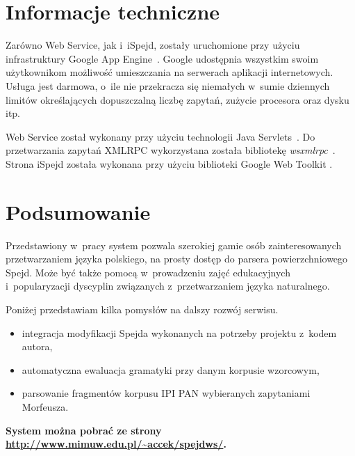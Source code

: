 \documentclass[11pt]{article}
\begin{document}
\section{Informacje techniczne}

Zarówno Web Service, jak i~iSpejd, zostały uruchomione przy użyciu
infrastruktury Google App Engine~\cite{appengine}. Google udostępnia wszystkim
swoim użytkownikom możliwość umieszczania na serwerach aplikacji internetowych.
Usługa jest darmowa, o~ile nie przekracza się niemałych w~sumie dziennych limitów
określających dopuszczalną liczbę zapytań, zużycie procesora oraz dysku itp.

Web Service został wykonany przy użyciu technologii Java
Servlets~\cite{servlets}. Do przetwarzania zapytań XML\dywiz RPC wykorzystana
została bibliotekę \emph{ws\dywiz xmlrpc}~\cite{wsxmlrpc}.
Strona iSpejd została wykonana przy użyciu biblioteki Google Web Toolkit
\cite{gwt}.

\section{Podsumowanie}

Przedstawiony w~pracy system pozwala szerokiej gamie osób zainteresowanych
przetwarzaniem języka polskiego, na prosty dostęp do parsera powierzchniowego
Spejd. Może być także pomocą w~prowadzeniu zajęć edukacyjnych i~popularyzacji
dyscyplin związanych z~przetwarzaniem języka naturalnego.

Poniżej przedstawiam kilka pomysłów na dalszy rozwój serwisu.
\begin{itemize}
  \item integracja modyfikacji Spejda wykonanych na potrzeby projektu 
    z~kodem autora,
  \item automatyczna ewaluacja gramatyki przy danym korpusie wzorcowym,
  \item parsowanie fragmentów korpusu IPI PAN wybieranych zapytaniami Morfeusza.
\end{itemize}

\noindent \textbf{System można pobrać ze strony
\url{http://www.mimuw.edu.pl/~accek/spejdws/}.}



\end{document}
